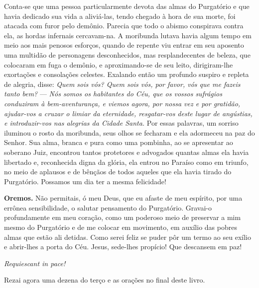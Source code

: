 Conta-se que uma pessoa particularmente devota das almas do Purgatório e que havia dedicado sua vida a aliviá-las, tendo chegado à hora de sua morte, foi atacada com furor pelo demônio. Parecia que todo o abismo conspirava contra ela, as hordas infernais cercavam-na. A moribunda lutava havia algum tempo em meio aos mais penosos esforços, quando de repente viu entrar em seu aposento uma multidão de personagens desconhecidos, mas resplandecentes de beleza, que colocaram em fuga o demônio, e aproximando-se de seu leito, dirigiram-lhe exortações e consolações celestes. Exalando então um profundo suspiro e repleta de alegria, disse: \textit{Quem sois vós? Quem sois vós, por favor, vós que me fazeis tanto bem?} --- \textit{Nós somos os habitantes do Céu, que os vossos sufrágios conduziram à bem-aventurança, e viemos agora, por nossa vez e por gratidão, ajudar-vos a cruzar o limiar da eternidade, resgatar-vos deste lugar de angústias, e introduzir-vos nas alegrias da Cidade Santa.} Por essas palavras, um sorriso iluminou o rosto da moribunda, seus olhos se fecharam e ela adormeceu na paz do Senhor. Sua alma, branca e pura como uma pombinha, ao se apresentar ao soberano Juiz, encontrou tantos protetores e advogados quantas almas ela havia libertado e, reconhecida digna da glória, ela entrou no Paraíso como em triunfo, no meio de aplausos e de bênçãos de todos aqueles que ela havia tirado do Purgatório. Possamos um dia ter a mesma felicidade!


\vspace{\baselineskip}\noindent \textbf{Oremos.} Não permitais, ó meu Deus, que eu afaste de meu espírito, por uma errônea sensibilidade, o salutar pensamento do Purgatório. Gravai-o profundamente em meu coração, como um poderoso meio de preservar a mim mesmo do Purgatório e de me colocar em movimento, em auxílio das pobres almas que estão ali detidas. Como serei feliz se puder pôr um termo ao seu exílio e abrir-lhes a porta do Céu. Jesus, sede-lhes propício! Que descansem em paz!



\begin{center}
\textit{Requiescant in pace!}
\end{center}

Rezai agora uma dezena do terço e as orações no final deste livro.
